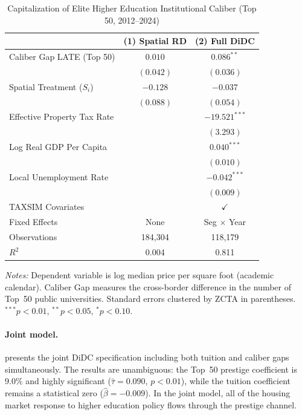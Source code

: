 \documentclass[12pt]{article}
\begin{document}
\begin{table}[t]
\begin{threeparttable}
\caption{Capitalization of Elite Higher Education Institutional Caliber (Top 50, 2012--2024)}\label{tab:caliber}
\begin{tabular}{lcc}
\toprule
 & (1) Spatial RD & (2) Full DiDC \\
\midrule
Caliber Gap LATE (Top 50) & $0.010$ & $0.086^{**}$ \\
 & $(0.042)$ & $(0.036)$ \\
Spatial Treatment ($S_i$) & $-0.128$ & $-0.037$ \\
 & $(0.088)$ & $(0.054)$ \\
Effective Property Tax Rate & & $-19.521^{***}$ \\
 & & $(3.293)$ \\
Log Real GDP Per Capita & & $0.040^{***}$ \\
 & & $(0.010)$ \\
Local Unemployment Rate & & $-0.042^{***}$ \\
 & & $(0.009)$ \\
\midrule
TAXSIM Covariates & & $\checkmark$ \\
Fixed Effects & None & Seg $\times$ Year \\
Observations & 184,304 & 118,179 \\
$R^2$ & 0.004 & 0.811 \\
\bottomrule
\end{tabular}
\begin{tablenotes}\small
\item \textit{Notes:} Dependent variable is log median price per square foot (academic calendar). Caliber Gap measures the cross-border difference in the number of Top~50 public universities. Standard errors clustered by ZCTA in parentheses. $^{***}p<0.01$, $^{**}p<0.05$, $^{*}p<0.10$.
\end{tablenotes}
\end{threeparttable}
\end{table}

\paragraph{Joint model.}  presents the joint DiDC specification including both tuition and caliber gaps simultaneously. The results are unambiguous: the Top~50 prestige coefficient is 9.0\% and highly significant ($\hat{\tau} = 0.090$, $p < 0.01$), while the tuition coefficient remains a statistical zero ($\hat{\beta} = -0.009$). In the joint model, all of the housing market response to higher education policy flows through the prestige channel.
\end{document}
